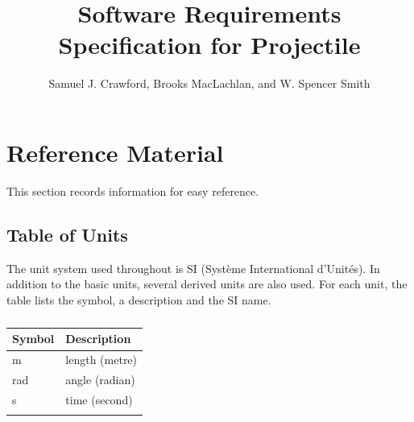 \documentclass[12pt]{article}
\title{Software Requirements Specification for Projectile}
\author{Samuel J. Crawford, Brooks MacLachlan, and W. Spencer Smith}
\begin{document}
\maketitle
\tableofcontents
\newpage
\section{Reference Material}
\label{Sec:RefMat}
This section records information for easy reference.
\subsection{Table of Units}
\label{Sec:ToU}
The unit system used throughout is SI (Système International d'Unités). In addition to the basic units, several derived units are also used. For each unit, the table lists the symbol, a description and the SI name.
\begin{longtable}{l l}
\toprule
Symbol & Description
\\
\midrule
\endhead
m & length (metre)
\\
rad & angle (radian)
\\
s & time (second)
\\
\bottomrule
\caption{}
\label{Table:ToU}
\end{longtable}
\end{document}
